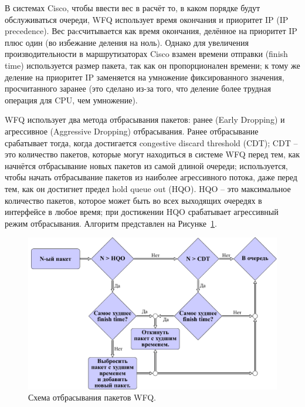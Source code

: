     В системах Cisco, чтобы ввести вес в расчёт то, в каком порядке будут обслуживаться очереди,
    WFQ использует время окончания и приоритет IP (IP precedence). Вес раcсчитывается
    как время окончания, делённое на приоритет IP плюс один (во избежание деления
    на ноль). Однако для увеличения производительности в маршрутизаторах Cisco
    взамен времени отправки (finish time) используется размер пакета, так как он
    пропорционален времени; к тому же деление на приоритет IP заменяется на умножение
    фиксированного значения, просчитанного заранее (это сделано из-за того,
    что деление более трудная операция для CPU, чем умножение).\cite{Vagesna}

    WFQ использует два метода отбрасывания пакетов: ранее (Early Dropping) и агрессивное
    (Aggressive Dropping) отбрасывания. Ранее отбрасывание срабатывает тогда, когда
    достигается congestive discard threshold (CDT); CDT -- это количество пакетов, которые могут
    находиться в системе WFQ перед тем, как начнётся отбрасывание новых пакетов
    из самой длиной очереди; используется, чтобы начать отбрасывание пакетов
    из наиболее агрессивного потока, даже перед тем, как он достигнет предел
    hold queue out (HQO). HQO -- это максимальное количество пакетов, которое может быть
    во всех выходящих очередях в интерфейсе в любое время; при достижении HQO
    срабатывает агрессивный режим отбрасывания. Алгоритм представлен на Рисунке~\ref{pic:wfqdropalgo}.
    \cite{wfqdrop}

    \begin{figure}[ht!]
			\center
        \includegraphics{./pdfimages/fwfq_drop.pdf}
        \caption{Схема отбрасывания пакетов WFQ.}
		\label{pic:wfqdropalgo}
    \end{figure}

